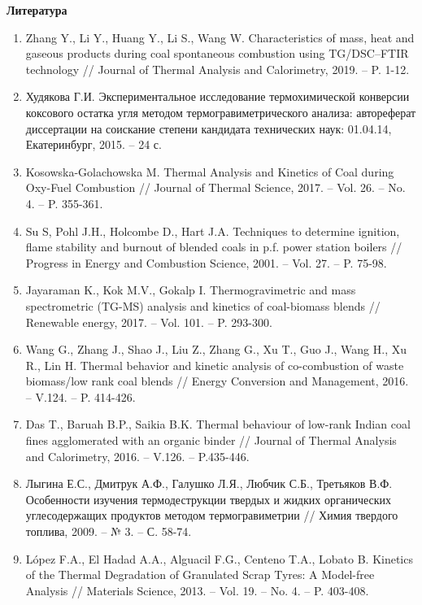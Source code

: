 {\bfseries Литература}

\begin{enumerate}
\item
Zhang Y., Li Y., Huang Y., Li S., Wang W. Characteristics of mass,
heat and gaseous products during coal spontaneous combustion using
TG/DSC--FTIR technology // Journal of Thermal Analysis and Calorimetry,
2019. -- P. 1-12.

\item
Худякова Г.И. Экспериментальное исследование термохимической
конверсии коксового остатка угля методом термогравиметрического анализа:
автореферат диссертации на соискание степени кандидата технических наук:
01.04.14, Екатеринбург, 2015. -- 24 с.

\item
Kosowska-Golachowska M. Thermal Analysis and Kinetics of Coal during
Oxy-Fuel Combustion // Journal of Thermal Science, 2017. -- Vol. 26. --
No. 4. -- P. 355-361.

\item
Su S, Pohl J.H., Holcombe D., Hart J.A. Techniques to determine
ignition, flame stability and burnout of blended coals in p.f. power
station boilers // Progress in Energy and Combustion Science, 2001. --
Vol. 27. -- P. 75-98.

\item
Jayaraman K., Kok M.V., Gokalp I. Thermogravimetric and mass
spectrometric (TG-MS) analysis and kinetics of coal-biomass blends //
Renewable energy, 2017. -- Vol. 101. -- P. 293-300.

\item
Wang G., Zhang J., Shao J., Liu Z., Zhang G., Xu T., Guo J., Wang H.,
Xu R., Lin H. Thermal behavior and kinetic analysis of co-combustion of
waste biomass/low rank coal blends // Energy Conversion and Management,
2016. -- V.124. -- P. 414-426.

\item
Das T., Baruah B.P., Saikia B.K. Thermal behaviour of low-rank Indian
coal fines agglomerated with an organic binder // Journal of Thermal
Analysis and Calorimetry, 2016. -- V.126. -- P.435-446.

\item
Лыгина Е.С., Дмитрук А.Ф., Галушко Л.Я., Любчик С.Б., Третьяков В.Ф.
Особенности изучения термодеструкции твердых и жидких органических
углесодержащих продуктов методом термогравиметрии // Химия твердого
топлива, 2009. -- № 3. -- С. 58-74.

\item
López F.A., El Hadad A.A., Alguacil F.G., Centeno T.A., Lobato B.
Kinetics of the Thermal Degradation of Granulated Scrap Tyres: A
Model-free Analysis // Materials Science, 2013. -- Vol. 19. -- No. 4. --
P. 403-408.


\end{enumerate}
